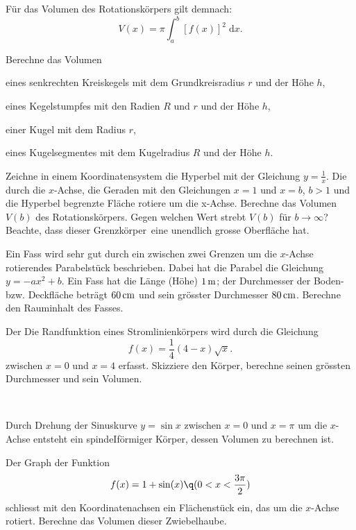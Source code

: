 \documentclass[%
11pt,%
twoside,%
titlepage,%
german,%
headsepline%
]{scrartcl}
\begin{document}
Für das Volumen des Rotationskörpers gilt demnach:
$$V(x)=\pi\int_a^b\left[f(x)\right]^2\;\mathrm{d}x.$$

\begin{ueb}[checkmate!]
Berechne das Volumen
\begin{enumeratea}
\item eines senkrechten Kreiskegels mit dem Grundkreisradius $r$ und der Höhe $h$,
\item eines Kegelstumpfes mit den Radien $R$ und $r$ und der Höhe $h$,
\item einer Kugel mit dem Radius $r$,
\item eines Kugelsegmentes mit dem Kugelradius $R$ und der Höhe $h$.
\end{enumeratea}
\end{ueb}

\begin{ueb}[hyperbolisch]
Zeichne in einem Koordinatensystem die Hyperbel mit der Gleichung $y=\frac{1}{x}$. Die durch die $x$-Achse, die Geraden mit den Gleichungen $x = 1$ und $x = b$, $b>1$ und die Hyperbel begrenzte Fläche rotiere um die x-Achse. Berechne das Volumen $V(b)$ des Rotationskörpers. Gegen welchen Wert strebt $V(b)$ für $b\to\infty$? Beachte, dass dieser \glqq Grenzkörper\grqq\ eine unendlich grosse Oberfläche hat.
\end{ueb}

\begin{ueb}
Ein Fass wird sehr gut durch ein zwischen zwei Grenzen um die $x$-Achse rotierendes Parabelstück beschrieben. Dabei hat die Parabel die Gleichung $y = - ax^2+b$. Ein Fass hat die Länge (Höhe) $\unit[1]{m}$; der Durchmesser der Boden- bzw. Deckfläche beträgt $\unit[60]{cm}$ und sein grösster Durchmesser $\unit[80]{cm}$. Berechne den Rauminhalt des Fasses.
\end{ueb}

\begin{ueb}[Tropf]
Der
Die Randfunktion eines Stromlinienkörpers wird durch die Gleichung
$$f(x)=\frac{1}{4}(4-x)\sqrt{x}.$$
zwischen $x = 0$ und $x = 4$ erfasst. Skizziere den Körper, berechne seinen grössten Durchmesser und sein Volumen.
\end{ueb}

\begin{ueb}[Träne]
\ \\[-4ex]
\begin{enumeratea}
\item Durch Drehung der Sinuskurve $y = \sin x$ zwischen $x = 0$ und $x = \pi$ um die $x$-Achse entsteht ein spindeIförmiger Körper, dessen Volumen zu berechnen ist.
\item Der Graph der Funktion
$$f(x)=1+\sin(x)\q(0<x<\frac{3\pi}{2})$$
schliesst mit den Koordinatenachsen ein Flächenstück ein, das um die $x$-Achse rotiert. Berechne das Volumen dieser \glqq Zwiebelhaube\grqq.
\end{enumeratea}
\end{ueb}
\end{document}
